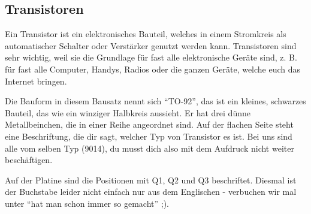 \documentclass[10pt]{article}
\begin{document}
	\subsection{Transistoren}
	\begin{minipage}{0.90\textwidth}
		Ein Transistor ist ein elektronisches Bauteil, welches in einem Stromkreis als automatischer Schalter oder Verstärker genutzt werden kann. Transistoren sind sehr wichtig, weil sie die Grundlage für fast alle elektronische Geräte sind, z. B. für fast alle Computer, Handys, Radios oder die ganzen Geräte, welche euch das Internet bringen.
		
		Die Bauform in diesem Bausatz nennt sich \enquote{TO-92}, das ist ein kleines, schwarzes Bauteil, das wie ein winziger Halbkreis aussieht. Er hat drei dünne Metallbeinchen, die in einer Reihe angeordnet sind. Auf der flachen Seite steht eine Beschriftung, die dir sagt, welcher Typ von Transistor es ist. Bei uns sind alle vom selben Typ (9014), du musst dich also mit dem Aufdruck nicht weiter beschäftigen.
		
		Auf der Platine sind die Positionen mit Q1, Q2 und Q3 beschriftet. Diesmal ist der Buchstabe leider nicht einfach nur aus dem Englischen - verbuchen wir mal unter \enquote{hat man schon immer so gemacht} ;).
	\end{minipage}
\end{document}
